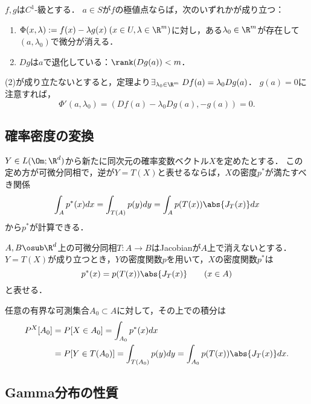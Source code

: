 \documentclass[uplatex,dvipdfmx]{jsarticle}
\begin{document}
\begin{corollary}
    $f,g$は$C^1$-級とする．
    $a\in S$が$f$の極値点ならば，次のいずれかが成り立つ：
    \begin{enumerate}
        \item $\Phi(x,\lambda):=f(x)-\lambda g(x)\;(x\in U,\lambda\in\R^m)$に対し，ある$\lambda_0\in\R^m$が存在して$(a,\lambda_0)$で微分が消える．
        \item $Dg$は$a$で退化している：$\rank(Dg(a))<m$．
    \end{enumerate}
\end{corollary}
\begin{Proof}
    (2)が成り立たないとすると，定理より$\exists_{\lambda_0\in\R^m}\;Df(a)=\lambda_0Dg(a)$．
    $g(a)=0$に注意すれば，
    \[\Phi'(a,\lambda_0)=(Df(a)-\lambda_0Dg(a),-g(a))=0.\]
\end{Proof}

\subsection{確率密度の変換}

\begin{tcolorbox}[colframe=ForestGreen, colback=ForestGreen!10!white,breakable,colbacktitle=ForestGreen!40!white,coltitle=black,fonttitle=\bfseries\sffamily,
title=]
    $Y\in L(\Om;\R^d)$から新たに同次元の確率変数ベクトル$X$を定めたとする．
    この定め方が可微分同相で，逆が$Y=T(X)$と表せるならば，$X$の密度$p^*$が満たすべき関係
    \[\int_A p^*(x)dx=\int_{T(A)}p(y)dy=\int_Ap(T(x))\abs{J_T(x)}dx\]
    から$p^*$が計算できる．
\end{tcolorbox}

\begin{proposition}[変数変換による密度関数の変換則]
    $A,B\osub\R^d$上の可微分同相$T:A\to B$はJacobianが$A$上で消えないとする．
    $Y=T(X)$が成り立つとき，$Y$の密度関数$p$を用いて，$X$の密度関数$p^*$は
    \[p^*(x)=p(T(x))\abs{J_T(x)}\qquad(x\in A)\]
    と表せる．
\end{proposition}
\begin{Proof}
    任意の有界な可測集合$A_0\subset A$に対して，その上での積分は
    \begin{align*}
        P^X[A_0]&=P[X\in A_0]=\int_{A_0}p^*(x)dx\\
        &=P[Y\in T(A_0)]=\int_{T(A_0)}p(y)dy=\int_{A_0}p(T(x))\abs{J_T(x)}dx.
    \end{align*}
\end{Proof}

\subsection{Gamma分布の性質}
\end{document}
